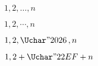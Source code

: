 \startTEXpage[offset=10pt]%
    \showmakeup[math]\showglyphs
    $1,2,\ldots,n$\par
    $1,2,\cdots,n$\par
    $1,2,\mathinner{\Uchar"2026},n$\par
    $1,2+\mathinner{\Uchar"22EF}+n$
\stopTEXpage

